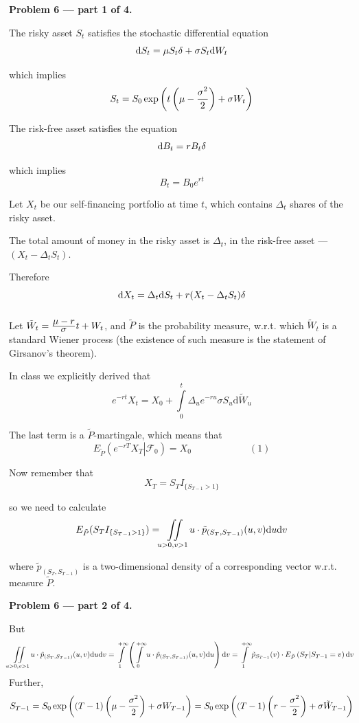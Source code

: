 \documentclass[pdftex,12pt,a4paper]{article}
\renewcommand{\FF}{\mathcal{F}}
\begin{document}
\textbf{Problem 6 --- part 1 of 4.}\par
The risky asset $S_{t}$ satisfies the stochastic differential equation $$\mathrm{d}S_{t} = \mu S_{t}\delta + \sigma S_{t}\mathrm{d}W_{t}$$\par which implies
$$
S_{t} = S_{0}\exp \left(t\left(\mu - \frac{\displaystyle \sigma^{2}}{\displaystyle 2}\right) + \sigma W_{t}\right)
$$\par
The risk-free asset satisfies the equation
$$
\mathrm{d}B_{t} = rB_{t}\delta
$$\par
which implies
$$
B_{t} = B_{0}e^{rt}
$$\par
Let $X_{t}$ be our self-financing portfolio at time $t$, which contains $\Delta_{t}$ shares of the risky asset.\par
The total amount of money in the risky asset is $\Delta_{t}$, in the risk-free asset --- $(X_{t} - \Delta_{t}S_{t})$.\par
Therefore
$$
\mathrm{d}X_{t} = \Delta_{t}\mathrm{d}S_{t} + r(X_{t} - \Delta_{t}S_{t})\delta
$$\[\]\par
Let $\tilde{W}_{t} = \frac{\displaystyle \mu - r}{\displaystyle \sigma}t + W_{t}$, and $\tilde{P}$ is the probability measure, w.r.t. which $\tilde{W}_{t}$ is a standard Wiener process (the existence of such measure is the statement of Girsanov's theorem).\par
In class we explicitly derived that
$$
e^{-rt}X_{t} = X_{0} + \int\limits_{0}^{t}\Delta_{u}e^{-ru}\sigma S_{u}\mathrm{d}\tilde{W}_{u}
$$\par
The last term is a $\tilde{P}$-martingale, which means that
$$
E_{\tilde{P}}\left(\left.e^{-rT}X_{T}\right|\FF_{0}\right) = X_{0} \qquad\qquad\qquad (1)
$$\par
Now remember that
$$
X_{T} = S_{T}I_{\{S_{T-1} > 1\}}
$$\par
so we need to calculate
$$
E_{\tilde{P}}(S_{T}I_{\{S_{T-1} > 1\}}) = \iint\limits_{u > 0, v > 1}u\cdot \tilde{p}_{(S_{T}, S_{T-1})}(u,v)\mathrm{d}u\mathrm{d}v
$$\par
where $\tilde{p}_{(S_{T}, S_{T-1})}$ is a two-dimensional density of a corresponding vector w.r.t. measure $\tilde{P}$.






\textbf{Problem 6 --- part 2 of 4.}\par
But
\[
\iint\limits_{u > 0, v > 1}u\cdot \tilde{p}_{(S_{T}, S_{T-1})}(u,v)\mathrm{d}u\mathrm{d}v = \int\limits_{1}^{+\infty}\left(\int\limits_{0}^{+\infty}u\cdot \tilde{p}_{(S_{T}, S_{T-1})}(u,v) \mathrm{d}u\right)\mathrm{d}v = \int\limits_{1}^{+\infty}\tilde{p}_{S_{T-1}}(v)\cdot E_{\tilde{P}}\left(S_{T} | S_{T-1} = v\right)\mathrm{d}v
\]
Further, 
\[
S_{T-1} = S_{0}\exp \left((T-1)\left(\mu - \frac{\displaystyle \sigma^{2}}{\displaystyle 2}\right) + \sigma W_{T-1}\right) = S_{0}\exp \left((T-1)\left(r - \frac{\displaystyle \sigma^{2}}{\displaystyle 2}\right) + \sigma \tilde{W}_{T-1}\right)
\]
\end{document}
